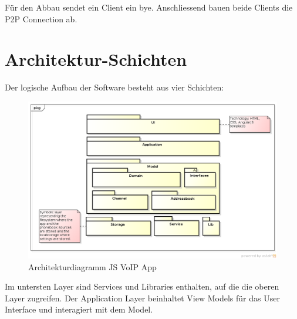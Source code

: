 	Für den Abbau sendet ein Client ein bye. Anschliessend bauen beide Clients die P2P Connection ab.

\section{Architektur-Schichten}
	Der logische Aufbau der Software besteht aus vier Schichten:
	\begin{figure}[H]
		\centering
		\includegraphics[width=1\textwidth]{../architekturanalayse/img/architecture.png}
		\caption{Architekturdiagramm JS VoIP App}
	\end{figure}
	Im untersten Layer sind Services und Libraries enthalten, auf die die oberen Layer zugreifen.
	Der Application Layer beinhaltet View Models für das User Interface und interagiert mit dem Model.
	

